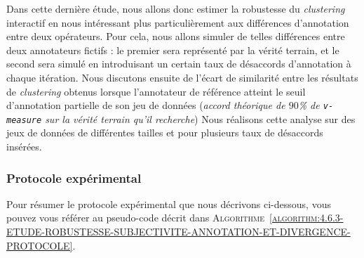 		Dans cette dernière étude, nous allons donc estimer la robustesse du \textit{clustering} interactif en nous intéressant plus particulièrement aux différences d'annotation entre deux opérateurs.
		Pour cela, nous allons simuler de telles différences entre deux annotateurs fictifs : le premier sera représenté par la vérité terrain, et le second sera simulé en introduisant un certain taux de désaccords d'annotation à chaque itération.
		Nous discutons ensuite de l'écart de similarité entre les résultats de \textit{clustering} obtenus lorsque l'annotateur de référence atteint le seuil d'annotation partielle de son jeu de données (\textit{accord théorique de $90$\% de \texttt{v-measure} sur la vérité terrain qu'il recherche})
		Nous réalisons cette analyse sur des jeux de données de différentes tailles et pour plusieurs taux de désaccords insérées.
	
		\subsubsection{Protocole expérimental}
			
			Pour résumer le protocole expérimental que nous décrivons ci-dessous, vous pouvez vous référer au pseudo-code décrit dans \textsc{Algorithme~\ref{algorithm:4.6.3-ETUDE-ROBUSTESSE-SUBJECTIVITE-ANNOTATION-ET-DIVERGENCE-PROTOCOLE}}.
			

